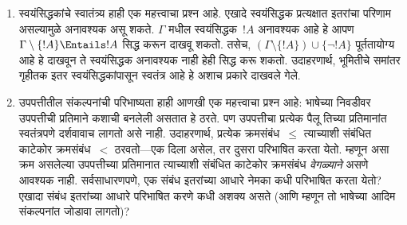 \documentclass[../../../include/open-logic-section]{subfiles}
\begin{document}
\begin{explain}
\begin{enumerate}
  पाहायची असते. ती परस्परविरोधी असतील, तर त्या नियमांचे पालन करणाऱ्या
  संकल्पना असूच शकत नाहीत आणि आपण विसंगत उपपत्ती मांडण्याचा प्रयत्न केलेला
  असतो. $\Gamma$ चे प्रतिमान शोधून असे घडत नाही हे आपण पडताळू शकतो. आणि
  आपल्या उपपत्तीची प्रतिमाने असतील, तर त्यांचा तपास करण्यासाठी तसेच प्रतिमाने
  रचण्यासाठी आपण तार्किक पद्धती वापरू शकतो.
\item स्वयंसिद्धकांचे स्वातंत्र्य हाही एक महत्त्वाचा प्रश्न आहे. एखादे
  स्वयंसिद्धक प्रत्यक्षात इतरांचा परिणाम असल्यामुळे अनावश्यक असू शकते.
  $\Gamma$ मधील स्वयंसिद्धक~$!A$ अनावश्यक आहे हे आपण
  $\Gamma \setminus \{!A\} \Entails !A$ सिद्ध करून दाखवू शकतो. तसेच,
  $(\Gamma \setminus \{!A\}) \cup \{\lnot !A\}$ पूर्ततायोग्य आहे हे
  दाखवून ते स्वयंसिद्धक अनावश्यक नाही हेही सिद्ध करू शकतो. उदाहरणार्थ,
  भूमितीचे समांतर गृहीतक इतर स्वयंसिद्धकांपासून स्वतंत्र आहे हे अशाच प्रकारे
  दाखवले गेले.
\item उपपत्तीतील संकल्पनांची परिभाष्यता हाही आणखी एक महत्त्वाचा प्रश्न आहे:
  भाषेच्या निवडीवर उपपत्तीची प्रतिमाने कशाची बनलेली असतात हे ठरते. पण
  उपपत्तीचा प्रत्येक पैलू तिच्या प्रतिमानांत स्वतंत्रपणे दर्शवावाच लागतो असे
  नाही. उदाहरणार्थ, प्रत्येक क्रमसंबंध~$\le$ त्याच्याशी संबंधित काटेकोर
  क्रमसंबंध~$<$ ठरवतो---एक दिला असेल, तर दुसरा परिभाषित करता येतो. म्हणून
  असा क्रम असलेल्या उपपत्तीच्या प्रतिमानात त्याच्याशी संबंधित काटेकोर
  क्रमसंबंध \emph{वेगळ्याने} असणे आवश्यक नाही. सर्वसाधारणपणे, एक संबंध
  इतरांच्या आधारे नेमका कधी परिभाषित करता येतो? एखादा संबंध इतरांच्या
  आधारे परिभाषित करणे कधी अशक्य असते (आणि म्हणून तो भाषेच्या आदिम
  संकल्पनांत जोडावा लागतो)?
\end{enumerate}
\end{explain}
\end{document}
